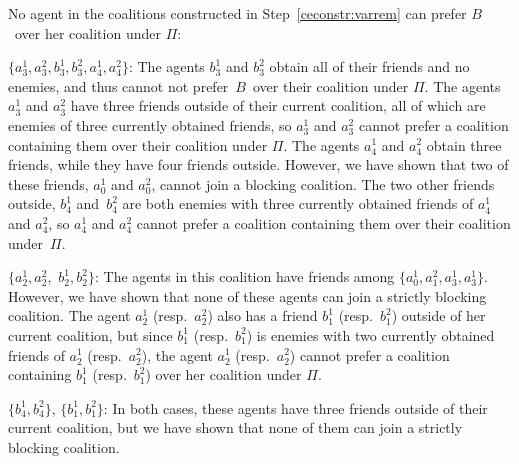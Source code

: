 \documentclass[a4paper,fleqn]{cas-sc}
\newcommand{\partition}{\ensuremath{\Pi}\xspace}
\newcommand{\blockingCoalition}{\ensuremath{B}\xspace}
\begin{document}
{No agent in the coalitions constructed in Step~\eqref{ceconstr:varrem} can prefer \blockingCoalition\ over her coalition under \partition:
\begin{compactitem}
\item $\{a^1_3, a^2_3, b^1_3, b^2_3, a^1_4, a^2_4\}$: The agents $b^1_3$ and $b^2_3$ obtain all of their friends and no enemies, and thus cannot not prefer~\blockingCoalition\ over their coalition under \partition. 
The agents $a^1_3$ and $a^2_3$ have three friends outside of their current coalition, all of which are enemies of three currently obtained friends, so $a^1_3$ and $a^2_3$ cannot prefer a coalition containing them over their coalition under \partition.
The agents $a^1_4$ and $a^2_4$ obtain three friends, while they have four friends outside. However, we have shown that two of these friends, $a^1_0$ and $a^2_0$, cannot join a blocking coalition.
The two other friends outside, $b^1_4$ and~$b^2_4$ are both enemies with three currently obtained friends of $a^1_4$ and $a^2_4$, so $a^1_4$ and $a^2_4$ cannot prefer a coalition containing them over their coalition under~\partition.
\item $\{a^1_{2}, a^2_{2},$ $b^1_{2}, b^2_{2}\}$: The agents in this coalition have friends among $\{a^1_0, a^2_1, a^1_3, a^1_3\}$. However, we have shown that none of these agents can join a strictly blocking coalition.
The agent $a^1_2$ (resp.\ $a^2_2$) also has a friend $b^1_1$ (resp.\ $b^2_1$) outside of her current coalition, but since  $b^1_1$ (resp.~$b^2_1$) is enemies with two currently obtained friends of  $a^1_2$ (resp.~$a^2_2$), the agent $a^1_2$ (resp.~$a^2_2$) cannot prefer a coalition containing $b^1_1$ (resp.\ $b^2_1$) over her coalition under \partition.
\item $\{b^1_4, b^2_4\}$, $\{b^1_1, b^2_1\}$: In both cases, these agents have three friends outside of their current coalition, but we have shown that none of them can join a strictly blocking coalition.
\end{compactitem}

}
\end{document}
